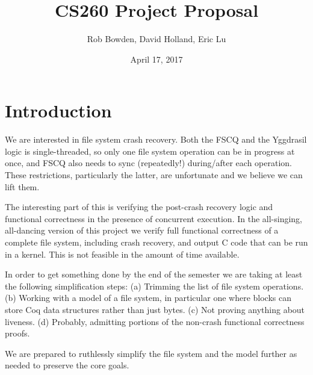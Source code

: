 \documentclass[11pt, twocolumn, letterpaper]{article}
\title{CS260 Project Proposal}
\author{Rob Bowden, David Holland, Eric Lu}
\date{April 17, 2017}
\begin{document}
\maketitle


\section{Introduction}

%

We are interested in
file system crash recovery.
Both the FSCQ and the Yggdrasil logic is single-threaded, so only
one file system operation can be in progress at once, and FSCQ also
needs to sync (repeatedly!) during/after each operation.
These restrictions, particularly the latter, are unfortunate
and we believe we can lift them.

The interesting part of this is verifying the post-crash recovery
logic and functional correctness in the presence of concurrent
execution.
In the all-singing, all-dancing version of this project we verify full
functional correctness of a complete file system, including crash
recovery, and output C code that can be run in a kernel.
This is not feasible in the amount of time available.

In order to get something done by the end of the semester we are
taking at least the following simplification steps:
(a) Trimming the list of file system operations.
(b) Working with a model of a file system, in particular one where
      blocks can store Coq data structures rather than just bytes.
(c) Not proving anything about liveness.
(d) Probably, admitting portions of the non-crash functional
      correctness proofs.

We are prepared to ruthlessly simplify the file system and the model
further as needed to preserve the core goals.

%
\end{document}
